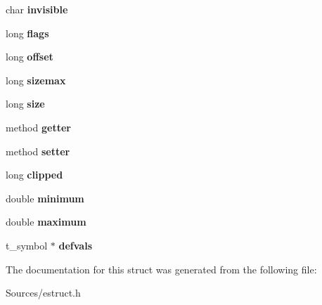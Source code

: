 \begin{DoxyCompactItemize}
\item 
\hypertarget{struct__eattr_a8cde8e3b0a36a73a41b56efcf538c2b6}{char {\bfseries invisible}}\label{struct__eattr_a8cde8e3b0a36a73a41b56efcf538c2b6}

\item 
\hypertarget{struct__eattr_a6a36e81b5744ff152979cae202d37e78}{long {\bfseries flags}}\label{struct__eattr_a6a36e81b5744ff152979cae202d37e78}

\item 
\hypertarget{struct__eattr_adcce6ee751c1469525aec834a4d37ea8}{long {\bfseries offset}}\label{struct__eattr_adcce6ee751c1469525aec834a4d37ea8}

\item 
\hypertarget{struct__eattr_add689f41a580354ce736986eb6dbafe4}{long {\bfseries sizemax}}\label{struct__eattr_add689f41a580354ce736986eb6dbafe4}

\item 
\hypertarget{struct__eattr_a37363161b41c4165b98cba7abc7a9d95}{long {\bfseries size}}\label{struct__eattr_a37363161b41c4165b98cba7abc7a9d95}

\item 
\hypertarget{struct__eattr_a356a5777ae542bd1da7749b82c7e4f3b}{method {\bfseries getter}}\label{struct__eattr_a356a5777ae542bd1da7749b82c7e4f3b}

\item 
\hypertarget{struct__eattr_af492684e247b25cfd1c14acc19a68fe6}{method {\bfseries setter}}\label{struct__eattr_af492684e247b25cfd1c14acc19a68fe6}

\item 
\hypertarget{struct__eattr_a631f53ecc3ce73c55ece3cec75708bcc}{long {\bfseries clipped}}\label{struct__eattr_a631f53ecc3ce73c55ece3cec75708bcc}

\item 
\hypertarget{struct__eattr_a4510e71778a7b0d3a4be9caaa8410a95}{double {\bfseries minimum}}\label{struct__eattr_a4510e71778a7b0d3a4be9caaa8410a95}

\item 
\hypertarget{struct__eattr_a26e8b97fa5003d22d7463f38699c669a}{double {\bfseries maximum}}\label{struct__eattr_a26e8b97fa5003d22d7463f38699c669a}

\item 
\hypertarget{struct__eattr_a924d892a1bc151dc21e9b93a5ff7f6fb}{t\-\_\-symbol $\ast$ {\bfseries defvals}}\label{struct__eattr_a924d892a1bc151dc21e9b93a5ff7f6fb}

\end{DoxyCompactItemize}


The documentation for this struct was generated from the following file\-:\begin{DoxyCompactItemize}
\item 
Sources/estruct.\-h\end{DoxyCompactItemize}
